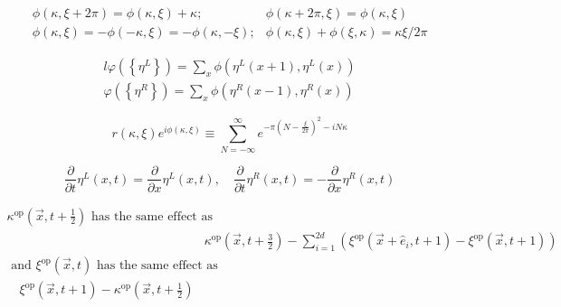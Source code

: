 \documentclass[main.tex]{subfiles}
\begin{document}
\begin{equation}\label{17.60}
	\begin{array}{ll}{\phi(\kappa, \xi+2 \pi)=\phi(\kappa, \xi)+\kappa ;} & {\phi(\kappa+2 \pi, \xi)=\phi(\kappa, \xi)} \\ {\phi(\kappa, \xi)=-\phi(-\kappa, \xi)=-\phi(\kappa,-\xi) ;} & {\phi(\kappa, \xi)+\phi(\xi, \kappa)=\kappa \xi / 2 \pi}\end{array}
\end{equation}



\begin{equation}\label{17.62}
	\begin{aligned}{l}{\varphi\left(\left\{\eta^{L}\right\}\right)=\sum_{x} \phi\left(\eta^{L}(x+1), \eta^{L}(x)\right)} \\ {\varphi\left(\left\{\eta^{R}\right\}\right)=\sum_x \phi\left(\eta^{R}(x-1), \eta^{R}(x)\right)}\end{aligned}
\end{equation}


\begin{equation}\label{17.63}
	r(\kappa, \xi) e^{i \phi(\kappa, \xi)} \equiv \sum_{N=-\infty}^{\infty} e^{-\pi\left(N-\frac{\xi}{2 \pi}\right)^{2}-i N \kappa}
\end{equation}


\begin{equation}\label{17.64}
	\frac{\partial}{\partial t} \eta^{L}(x, t)=\frac{\partial}{\partial x} \eta^{L}(x, t), \quad \frac{\partial}{\partial t} \eta^{R}(x, t)=-\frac{\partial}{\partial x} \eta^{R}(x, t)
\end{equation}







\begin{equation}\label{17.69}
	\begin{aligned} \kappa^{\mathrm{op}}\left(\vec{x}, t+\frac{1}{2}\right) \text { has the same effect as } \\ & \kappa^{\mathrm{op}}\left(\vec{x}, t+\frac{3}{2}\right)-\sum_{i=1}^{2 d}\left(\xi^{\mathrm{op}}\left(\vec{x}+\hat{e}_{i}, t+1\right)-\xi^{\mathrm{op}}(\vec{x}, t+1)\right) \\ \text { and } \xi^{\mathrm{op}}(\vec{x}, t) \text { has the same effect as } \\ \quad \xi^{\mathrm{op}}(\vec{x}, t+1)-\kappa^{\mathrm{op}}\left(\vec{x}, t+\frac{1}{2}\right) \end{aligned}
\end{equation}
\end{document}
